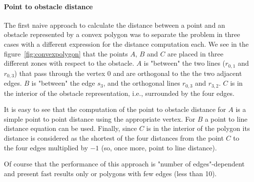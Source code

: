\paragraph{Point to obstacle distance}

The first naive approach to calculate the distance between a point and an obstacle represented by a convex polygon was to separate the problem in three cases with a different expression for the distance computation each. We see in the figure~\ref{fig:convexpolygon} that the points $A$, $B$ and $C$ are placed in three different zones with respect to the obstacle. $A$ is "between" the two lines ($r_{0,1}$ and $r_{0,3}$) that pass through the vertex $0$ and are orthogonal to the the two adjacent edges. $B$ is "between" the edge $s_{3}$, and the orthogonal lines $r_{0,3}$ and $r_{3,2}$. $C$ is in the interior of the obstacle representation, i.e., surrounded by the four edges.

It is easy to see that the computation of the point to obstacle distance for $A$ is a simple point to point distance using the appropriate vertex. For $B$ a point to line distance equation can be used. Finally, since $C$ is in the interior of the polygon its distance is considered as the shortest of the four distances from the point $C$ to the four edges multiplied by $-1$ (so, once more, point to line distance).

Of course that the performance of this approach is "number of edges"-dependent and present fast results only or polygons with few edges (less than 10). 

